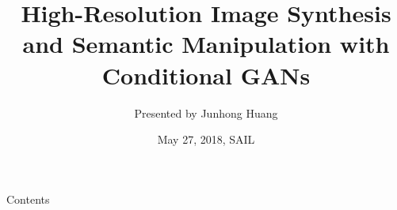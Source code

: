 \documentclass{beamer}
\begin{document}
  
	
	
	
	\title{High-Resolution Image Synthesis and Semantic Manipulation with Conditional GANs}
	\author{Presented by Junhong Huang}
	\date{May 27, 2018, SAIL}
	
	\begin{frame}
	\maketitle
\end{frame}

\begin{frame}{Contents}
\tableofcontents
\end{frame}



\end{document}

